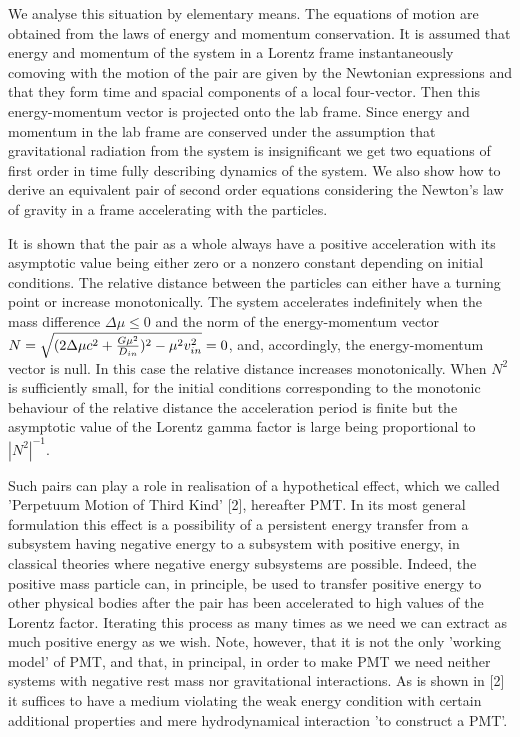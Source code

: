 \documentclass[aip,nofootinbib]{revtex4}
\begin{document}
We analyse this situation by elementary means. The equations of
motion are obtained from the laws of energy and momentum
conservation. It is assumed that energy and momentum of the system
in a Lorentz frame instantaneously comoving with the motion of the
pair are given by the Newtonian expressions and that they form
time and spacial components of a local four-vector. Then this
energy-momentum vector is projected onto the lab frame. Since
energy and momentum in the lab frame are conserved under the
assumption that gravitational radiation from the system is
insignificant we get two equations of first order in time fully
describing dynamics of the system. We also show how to derive an
equivalent pair of second order  equations considering the
Newton's law of gravity in a frame accelerating with the
particles.

It is shown that the pair as a whole always have a positive
acceleration with its asymptotic value  being either zero or a
nonzero constant depending on initial conditions. The relative
distance between the particles can either have a turning point or
increase monotonically. The system accelerates indefinitely when
the mass difference $\Delta \mu \le 0$ and the norm of the
energy-momentum vector $N=\sqrt{(2\Delta \mu c^2 +{G\mu^{2}\over
D_{in}})^{2}-\mu^2v_{in}^2}=0$, and, accordingly, the
energy-momentum vector is null. In this case the relative distance
increases monotonically. When $N^2$ is sufficiently small, for the
initial conditions corresponding to the monotonic behaviour of the
relative distance the acceleration period is finite but the
asymptotic value of the Lorentz gamma factor is large being
proportional to $|N^{2}|^{-1}$.


Such pairs can play a role in realisation of a hypothetical
effect, which we called 'Perpetuum Motion of Third Kind' [2],
hereafter PMT. In its most general formulation this effect is a
possibility of a persistent energy transfer from a subsystem
having negative energy to a subsystem with positive energy, in
classical theories where negative energy subsystems are possible.
Indeed, the positive mass particle can, in principle, be used to
transfer positive energy to other physical bodies after the pair
has been accelerated to high values of the Lorentz factor.
Iterating this process as many times as we need we can extract as
much positive energy as we wish. Note, however, that it is not the
only 'working model' of PMT, and that, in principal, in order to
make PMT we need neither systems with negative rest mass nor
gravitational interactions. As is shown in [2] it suffices to have
a medium violating the weak energy condition with certain
additional properties and mere hydrodynamical interaction 'to
construct a PMT'.
\end{document}
